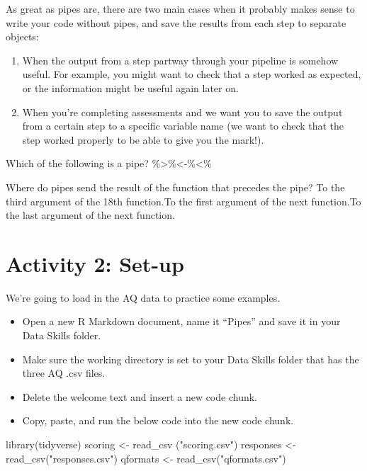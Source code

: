 \documentclass[
  oneside]{book}
\newenvironment{Shaded}{\begin{snugshade}}{\end{snugshade}}
\newcommand{\FunctionTok}[1]{\textcolor[rgb]{0.00,0.00,0.00}{#1}}
\newcommand{\NormalTok}[1]{#1}
\newcommand{\OtherTok}[1]{\textcolor[rgb]{0.56,0.35,0.01}{#1}}
\newcommand{\StringTok}[1]{\textcolor[rgb]{0.31,0.60,0.02}{#1}}
\providecommand{\tightlist}{%
  \setlength{\itemsep}{0pt}\setlength{\parskip}{0pt}}
\begin{document}
\begin{danger}
As great as pipes are, there are two main cases when it probably makes
sense to write your code without pipes, and save the results from each
step to separate objects:

\begin{enumerate}
\def\labelenumi{\arabic{enumi}.}
\item
  When the output from a step partway through your pipeline is somehow
  useful. For example, you might want to check that a step worked as
  expected, or the information might be useful again later on.
\item
  When you're completing assessments and we want you to save the output
  from a certain step to a specific variable name (we want to check that
  the step worked properly to be able to give you the mark!).
\end{enumerate}
\end{danger}

Which of the following is a pipe? \%\textgreater\%\textless-\%\textless\%

Where do pipes send the result of the function that precedes the pipe? To the third argument of the 18th function.To the first argument of the next function.To the last argument of the next function.

\hypertarget{activity-2-set-up-1}{%
\section{Activity 2: Set-up}\label{activity-2-set-up-1}}

We're going to load in the AQ data to practice some examples.

\begin{itemize}
\tightlist
\item
  Open a new R Markdown document, name it ``Pipes'' and save it in your Data Skills folder.
\item
  Make sure the working directory is set to your Data Skills folder that has the three AQ .csv files.
\item
  Delete the welcome text and insert a new code chunk.
\item
  Copy, paste, and run the below code into the new code chunk.
\end{itemize}

\begin{Shaded}
\begin{Highlighting}[]
\FunctionTok{library}\NormalTok{(tidyverse)}
\NormalTok{scoring }\OtherTok{\textless{}{-}} \FunctionTok{read\_csv}\NormalTok{ (}\StringTok{"scoring.csv"}\NormalTok{)}
\NormalTok{responses }\OtherTok{\textless{}{-}} \FunctionTok{read\_csv}\NormalTok{(}\StringTok{"responses.csv"}\NormalTok{)}
\NormalTok{qformats }\OtherTok{\textless{}{-}} \FunctionTok{read\_csv}\NormalTok{(}\StringTok{"qformats.csv"}\NormalTok{)}
\end{Highlighting}
\end{Shaded}
\end{document}
